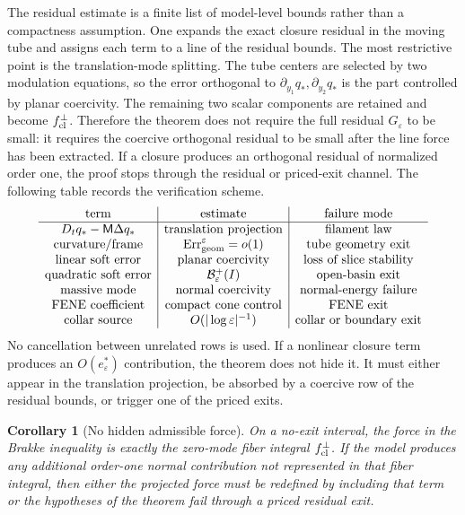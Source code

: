 \documentclass[11pt]{article}
\newtheorem{corollary}[theorem]{Corollary}
\theoremstyle{definition}
\newcommand{\eps}{\varepsilon}
\newcommand{\estar}{e_\varepsilon^\ast}
\newcommand{\Basin}{\mathcal B}
\newcommand{\Mmob}{\mathsf M}
\begin{document}
The residual estimate is a finite list of model-level bounds rather than a
compactness assumption.  One expands the exact closure residual in the moving
tube and assigns each term to a line of the residual bounds.  The most restrictive point
is the translation-mode splitting.  The tube centers are selected by two
modulation equations, so the error orthogonal to
\(\partial_{y_1}q_\ast,\partial_{y_2}q_\ast\) is the part controlled by planar
coercivity.  The remaining two scalar components are retained and become
\(f_{\rm cl}^\perp\).  Therefore the theorem does not require the full residual
\(G_\eps\) to be small: it requires the coercive orthogonal residual to be small
after the line force has been extracted.  If a closure produces an orthogonal
residual of normalized order one, the proof stops through the residual or
priced-exit channel.  The following table records the verification scheme.
\[
\begin{array}{c|c|c}
\hbox{term} & \hbox{estimate} & \hbox{failure mode}\\ \hline
D_tq_\ast-\Mmob\Delta q_\ast
& \hbox{translation projection}
& \hbox{filament law}\\
\hbox{curvature/frame}
& {\rm Err}_{\rm geom}^\eps=o(1)
& \hbox{tube geometry exit}\\
\hbox{linear soft error}
& \hbox{planar coercivity}
& \hbox{loss of slice stability}\\
\hbox{quadratic soft error}
& \Basin_\eps^+(I)
& \hbox{open-basin exit}\\
\hbox{massive mode}
& \hbox{normal coercivity}
& \hbox{normal-energy failure}\\
\hbox{FENE coefficient}
& \hbox{compact cone control}
& \hbox{FENE exit}\\
\hbox{collar source}
& O(|\log\eps|^{-1})
& \hbox{collar or boundary exit}
\end{array}
\]
No cancellation between unrelated rows is used.  If a nonlinear closure term
produces an \(O(\estar)\) contribution, the theorem does not hide it.  It must
either appear in the translation projection, be absorbed by a coercive row of
the residual bounds, or trigger one of the priced exits.

\begin{corollary}[No hidden admissible force]
\label{cor:no-hidden-force}
On a no-exit interval, the force in the Brakke inequality is exactly the
zero-mode fiber integral \(f_{\rm cl}^\perp\).  If the model produces any
additional order-one normal contribution not represented in that fiber
integral, then either the projected force must be redefined by including that
term or the hypotheses of the theorem fail through a priced residual exit.
\end{corollary}
\end{document}
